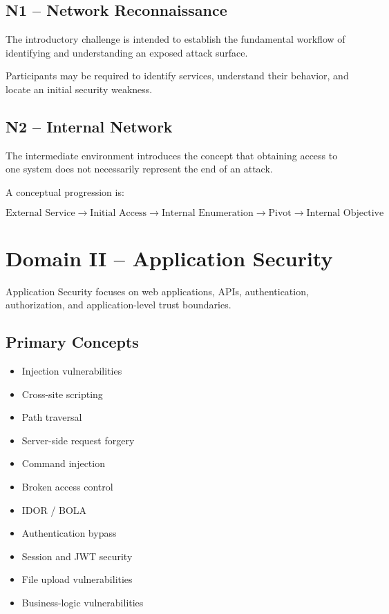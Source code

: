 \documentclass[11pt,a4paper]{article}
\begin{document}
\subsection{N1 -- Network Reconnaissance}

The introductory challenge is intended to establish the fundamental
workflow of identifying and understanding an exposed attack surface.

Participants may be required to identify services, understand their
behavior, and locate an initial security weakness.


\subsection{N2 -- Internal Network}

The intermediate environment introduces the concept that obtaining
access to one system does not necessarily represent the end of an
attack.

A conceptual progression is:

\[
\text{External Service}
\rightarrow
\text{Initial Access}
\rightarrow
\text{Internal Enumeration}
\rightarrow
\text{Pivot}
\rightarrow
\text{Internal Objective}
\]



\section{Domain II -- Application Security}

Application Security focuses on web applications, APIs,
authentication, authorization, and application-level trust
boundaries.


\subsection{Primary Concepts}

\begin{itemize}

    \item Injection vulnerabilities
    \item Cross-site scripting
    \item Path traversal
    \item Server-side request forgery
    \item Command injection
    \item Broken access control
    \item IDOR / BOLA
    \item Authentication bypass
    \item Session and JWT security
    \item File upload vulnerabilities
    \item Business-logic vulnerabilities

\end{itemize}
\end{document}

